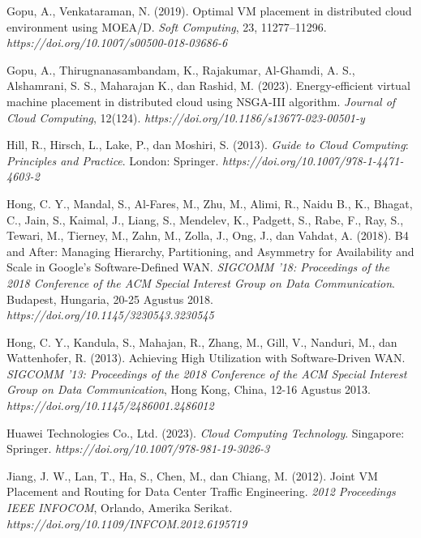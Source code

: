 \begin{thebibliography}{99}
	

	Gopu, A., Venkataraman, N. (2019). Optimal VM placement in distributed cloud environment using MOEA/D. \textit{Soft Computing}, 23, 11277–11296. \textit{https://doi.org/10.1007/s00500-018-03686-6}
	
	

	Gopu, A., Thirugnanasambandam, K., Rajakumar, Al-Ghamdi, A. S., Alshamrani, S. S., Maharajan K., dan Rashid, M. (2023). Energy-efficient virtual machine placement in distributed cloud using NSGA-III algorithm. \textit{Journal of Cloud Computing}, 12(124). \textit{https://doi.org/10.1186/s13677-023-00501-y} 
	
	

	Hill, R., Hirsch, L., Lake, P., dan Moshiri, S. (2013). \textit{Guide to Cloud Computing}: \textit{Principles and Practice}. London: Springer. \textit{https://doi.org/10.1007/978-1-4471-4603-2}

	

	Hong, C. Y., Mandal, S., Al-Fares, M., Zhu, M., Alimi, R., Naidu B., K., Bhagat, C., Jain, S., Kaimal, J., Liang, S., Mendelev, K., Padgett, S., Rabe, F., Ray, S., Tewari, M., Tierney, M., Zahn, M., Zolla, J., Ong, J., dan Vahdat, A. (2018). B4 and After: Managing Hierarchy, Partitioning, and Asymmetry for Availability and Scale in Google’s Software-Defined WAN. \textit{SIGCOMM '18: Proceedings of the 2018 Conference of the ACM Special Interest Group on Data Communication}. Budapest, Hungaria, 20-25 Agustus 2018. \textit{https://doi.org/10.1145/3230543.3230545} 
	
	

	Hong, C. Y., Kandula, S., Mahajan, R., Zhang, M., Gill, V., Nanduri, M., dan Wattenhofer, R. (2013). Achieving High Utilization with Software-Driven WAN. \textit{SIGCOMM '13: Proceedings of the 2018 Conference of the ACM Special Interest Group on Data Communication}, Hong Kong, China, 12-16 Agustus 2013. \textit{https://doi.org/10.1145/2486001.2486012}
	
	

	Huawei Technologies Co., Ltd. (2023). \textit{Cloud Computing Technology}. Singapore: Springer. \textit{https://doi.org/10.1007/978-981-19-3026-3}
	
	

	Jiang, J. W., Lan, T., Ha, S., Chen, M., dan Chiang, M. (2012). Joint VM Placement and Routing for Data Center Traffic Engineering. \textit{2012 Proceedings IEEE INFOCOM}, Orlando, Amerika Serikat. \textit{https://doi.org/10.1109/INFCOM.2012.6195719}
	

\end{thebibliography}
